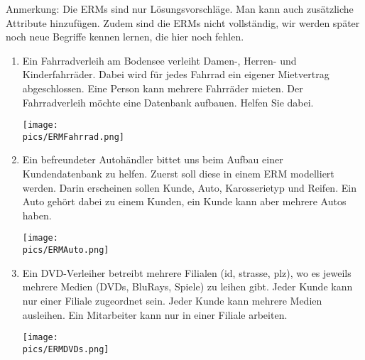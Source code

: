 \begin{Answer}[ref=ERMErstellen1]
	Anmerkung: Die ERMs sind nur Lösungsvorschläge. Man kann auch zusätzliche Attribute hinzufügen. Zudem sind die ERMs nicht vollständig, wir werden später noch neue Begriffe kennen lernen, die hier noch fehlen.
	\begin{enumerate}
		\item Ein Fahrradverleih am Bodensee verleiht Damen-, Herren- und Kinderfahrräder. Dabei wird für jedes Fahrrad ein eigener Mietvertrag abgeschlossen. Eine Person kann mehrere Fahrräder mieten. Der Fahrradverleih möchte eine Datenbank aufbauen. Helfen Sie dabei.\\
		\begin{minipage}{0.8\textwidth}
			\centering\texttt{[image: \\pics/ERMFahrrad.png]}\\
		\end{minipage}
		\item Ein befreundeter Autohändler bittet uns beim Aufbau einer Kundendatenbank zu helfen. Zuerst soll diese in einem ERM modelliert werden. Darin erscheinen sollen Kunde, Auto, Karosserietyp und Reifen. Ein Auto gehört dabei zu einem Kunden, ein Kunde kann aber mehrere Autos haben.\\
		\begin{minipage}{0.8\textwidth}
			\centering\texttt{[image: \\pics/ERMAuto.png]}\\
		\end{minipage}
		\item Ein DVD-Verleiher betreibt mehrere Filialen (id, strasse, plz), wo es jeweils mehrere Medien (DVDs, BluRays, Spiele) zu leihen gibt. Jeder Kunde kann nur einer Filiale zugeordnet sein. Jeder Kunde kann mehrere Medien ausleihen. Ein Mitarbeiter kann nur in einer Filiale arbeiten.\\
		\begin{minipage}{0.8\textwidth}
			\centering\texttt{[image: \\pics/ERMDVDs.png]}\\
		\end{minipage}
	\end{enumerate}
\end{Answer}

